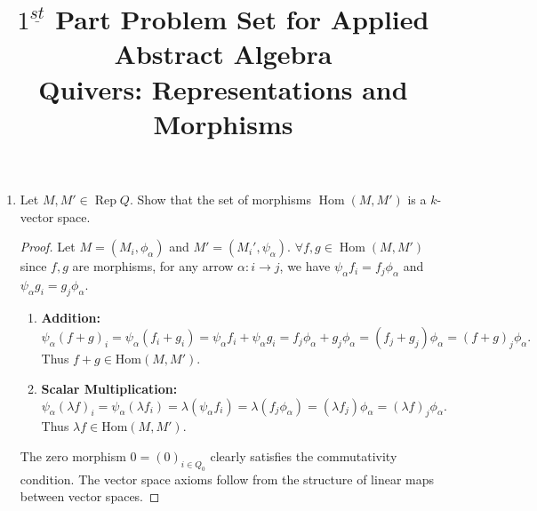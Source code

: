 \documentclass[11pt, a4paper]{article}
\title{\textbf{$1^{\underline{st}}$ Part Problem Set for Applied Abstract Algebra} \\ Quivers: Representations and Morphisms}
\author{}
\date{}
\begin{document}
\maketitle

\begin{enumerate}[leftmargin=*, label=\textbf{\arabic*.}]

\item Let $M, M' \in \operatorname{Rep} Q$. Show that the set of morphisms $\operatorname{Hom}(M, M')$ is a $k$-vector space.

\begin{proof}
Let $ M=(M_i, \phi_\alpha) $ and $ M'=(M_i', \psi_\alpha) $. $\forall f,g \in \operatorname{Hom}(M,M')$ since $ f,g $ are morphisms, for any arrow $ \alpha: i \to j $, we have $ \psi_\alpha f_i = f_j \phi_\alpha $ and $ \psi_\alpha g_i = g_j \phi_\alpha $.
    \begin{enumerate}
        \item \textbf{Addition:}
        \[
        \psi_\alpha (f+g)_i = \psi_\alpha (f_i + g_i) = \psi_\alpha f_i + \psi_\alpha g_i = f_j \phi_\alpha + g_j \phi_\alpha = (f_j + g_j) \phi_\alpha = (f+g)_j \phi_\alpha.
        \]
        Thus $ f+g \in \mathrm{Hom}(M,M') $.
        \item \textbf{Scalar Multiplication:}
        \[
        \psi_\alpha (\lambda f)_i = \psi_\alpha (\lambda f_i) = \lambda (\psi_\alpha f_i) = \lambda (f_j \phi_\alpha) = (\lambda f_j) \phi_\alpha = (\lambda f)_j \phi_\alpha.
        \]
        Thus $ \lambda f \in \mathrm{Hom}(M,M') $.
    \end{enumerate}
The zero morphism $ 0=(0)_{i \in Q_0} $ clearly satisfies the commutativity condition. The vector space axioms follow from the structure of linear maps between vector spaces.
\end{proof}


\end{enumerate}
\end{document}
